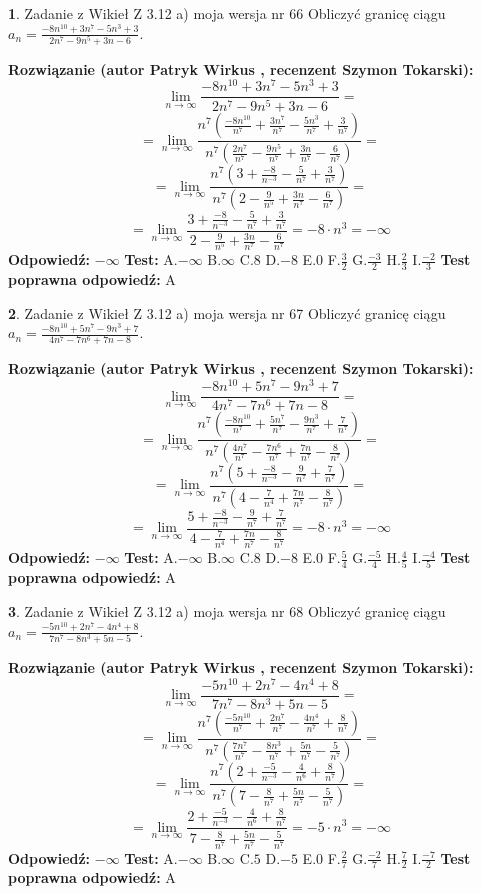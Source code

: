 \documentclass[12pt, a4paper]{article}
\theoremstyle{definition} %
\newtheorem{zad}{}
\newcommand{\zadStart}[1]{\begin{zad}#1\newline}
\newcommand{\zadStop}{\end{zad}}
\newcommand{\rozwStart}[2]{\noindent \textbf{Rozwiązanie (autor #1 , recenzent #2): }\newline}
\newcommand{\rozwStop}{\newline}
\newcommand{\odpStart}{\noindent \textbf{Odpowiedź:}\newline}
\newcommand{\odpStop}{\newline}
\newcommand{\testStart}{\noindent \textbf{Test:}\newline}
\newcommand{\testStop}{\newline}
\newcommand{\kluczStart}{\noindent \textbf{Test poprawna odpowiedź:}\newline}
\newcommand{\kluczStop}{\newline}
\begin{document}
\zadStart{Zadanie z Wikieł Z 3.12 a) moja wersja nr 66}
Obliczyć granicę ciągu $a_{n}=\frac{-8n^{10}+3n^{7}-5n^{3}+3}{2n^{7}-9n^{5}+3n-6}$.
\zadStop
\rozwStart{Patryk Wirkus}{Szymon Tokarski}
$$\lim\limits_{n\to\infty}\frac{-8n^{10}+3n^{7}-5n^{3}+3}{2n^{7}-9n^{5}+3n-6}=$$
$$=\lim\limits_{n\to\infty}\frac{n^{7}\left(\frac{-8n^{10}}{n^{7}}+\frac{3n^{7}}{n^{7}}-\frac{5n^{3}}{n^{7}}+\frac{3}{n^{7}}\right)}{n^{7}\left(\frac{2n^{7}}{n^{7}}-\frac{9n^{5}}{n^{7}}+\frac{3n}{n^{7}}-\frac{6}{n^{7}}\right)}=$$
$$=\lim\limits_{n\to\infty}\frac{n^{7}\left(3+\frac{-8}{n^{-3}}-\frac{5}{n^{7}}+\frac{3}{n^{7}}\right)}
{n^{7}\left(2-\frac{9}{n^{5}}+\frac{3n}{n^{7}}-\frac{6}{n^{7}}\right)}=$$
$$=\lim\limits_{n\to\infty}\frac{3+\frac{-8}{n^{-3}}-\frac{5}{n^{7}}+\frac{3}{n^{7}}}{2-\frac{9}{n^{5}}+\frac{3n}{n^{7}}-\frac{6}{n^{7}}}=-8\cdot n^{3} = -\infty$$
\rozwStop
\odpStart
$-\infty$
\odpStop
\testStart
A.$-\infty$
B.$\infty$
C.$8$
D.$-8$
E.$0$
F.$\frac{3}{2}$
G.$\frac{-3}{2}$
H.$\frac{2}{3}$
I.$\frac{-2}{3}$
\testStop
\kluczStart
A
\kluczStop



\zadStart{Zadanie z Wikieł Z 3.12 a) moja wersja nr 67}
Obliczyć granicę ciągu $a_{n}=\frac{-8n^{10}+5n^{7}-9n^{3}+7}{4n^{7}-7n^{6}+7n-8}$.
\zadStop
\rozwStart{Patryk Wirkus}{Szymon Tokarski}
$$\lim\limits_{n\to\infty}\frac{-8n^{10}+5n^{7}-9n^{3}+7}{4n^{7}-7n^{6}+7n-8}=$$
$$=\lim\limits_{n\to\infty}\frac{n^{7}\left(\frac{-8n^{10}}{n^{7}}+\frac{5n^{7}}{n^{7}}-\frac{9n^{3}}{n^{7}}+\frac{7}{n^{7}}\right)}{n^{7}\left(\frac{4n^{7}}{n^{7}}-\frac{7n^{6}}{n^{7}}+\frac{7n}{n^{7}}-\frac{8}{n^{7}}\right)}=$$
$$=\lim\limits_{n\to\infty}\frac{n^{7}\left(5+\frac{-8}{n^{-3}}-\frac{9}{n^{7}}+\frac{7}{n^{7}}\right)}
{n^{7}\left(4-\frac{7}{n^{4}}+\frac{7n}{n^{7}}-\frac{8}{n^{7}}\right)}=$$
$$=\lim\limits_{n\to\infty}\frac{5+\frac{-8}{n^{-3}}-\frac{9}{n^{7}}+\frac{7}{n^{7}}}{4-\frac{7}{n^{4}}+\frac{7n}{n^{7}}-\frac{8}{n^{7}}}=-8\cdot n^{3} = -\infty$$
\rozwStop
\odpStart
$-\infty$
\odpStop
\testStart
A.$-\infty$
B.$\infty$
C.$8$
D.$-8$
E.$0$
F.$\frac{5}{4}$
G.$\frac{-5}{4}$
H.$\frac{4}{5}$
I.$\frac{-4}{5}$
\testStop
\kluczStart
A
\kluczStop



\zadStart{Zadanie z Wikieł Z 3.12 a) moja wersja nr 68}
Obliczyć granicę ciągu $a_{n}=\frac{-5n^{10}+2n^{7}-4n^{4}+8}{7n^{7}-8n^{3}+5n-5}$.
\zadStop
\rozwStart{Patryk Wirkus}{Szymon Tokarski}
$$\lim\limits_{n\to\infty}\frac{-5n^{10}+2n^{7}-4n^{4}+8}{7n^{7}-8n^{3}+5n-5}=$$
$$=\lim\limits_{n\to\infty}\frac{n^{7}\left(\frac{-5n^{10}}{n^{7}}+\frac{2n^{7}}{n^{7}}-\frac{4n^{4}}{n^{7}}+\frac{8}{n^{7}}\right)}{n^{7}\left(\frac{7n^{7}}{n^{7}}-\frac{8n^{3}}{n^{7}}+\frac{5n}{n^{7}}-\frac{5}{n^{7}}\right)}=$$
$$=\lim\limits_{n\to\infty}\frac{n^{7}\left(2+\frac{-5}{n^{-3}}-\frac{4}{n^{6}}+\frac{8}{n^{7}}\right)}
{n^{7}\left(7-\frac{8}{n^{7}}+\frac{5n}{n^{7}}-\frac{5}{n^{7}}\right)}=$$
$$=\lim\limits_{n\to\infty}\frac{2+\frac{-5}{n^{-3}}-\frac{4}{n^{6}}+\frac{8}{n^{7}}}{7-\frac{8}{n^{7}}+\frac{5n}{n^{7}}-\frac{5}{n^{7}}}=-5\cdot n^{3} = -\infty$$
\rozwStop
\odpStart
$-\infty$
\odpStop
\testStart
A.$-\infty$
B.$\infty$
C.$5$
D.$-5$
E.$0$
F.$\frac{2}{7}$
G.$\frac{-2}{7}$
H.$\frac{7}{2}$
I.$\frac{-7}{2}$
\testStop
\kluczStart
A
\kluczStop
\end{document}
